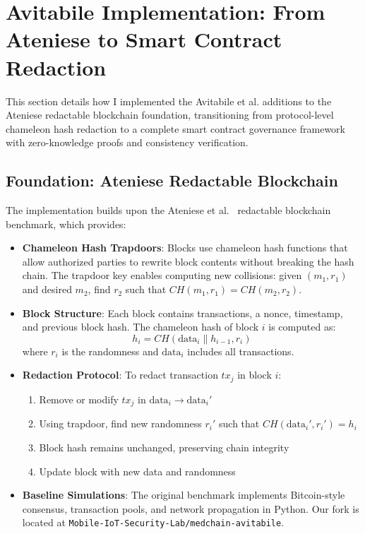 \section{Avitabile Implementation: From Ateniese to Smart Contract Redaction}
\label{sec:avitabile_implementation}

This section details how I implemented the Avitabile et al. additions to the Ateniese redactable blockchain foundation, transitioning from protocol-level chameleon hash redaction to a complete smart contract governance framework with zero-knowledge proofs and consistency verification.

\subsection{Foundation: Ateniese Redactable Blockchain}

The implementation builds upon the Ateniese et al.~\cite{ateniese2017redactable} redactable blockchain benchmark, which provides:

\begin{itemize}
    \item \textbf{Chameleon Hash Trapdoors}: Blocks use chameleon hash functions that allow authorized parties to rewrite block contents without breaking the hash chain. The trapdoor key enables computing new collisions: given $(m_1, r_1)$ and desired $m_2$, find $r_2$ such that $CH(m_1, r_1) = CH(m_2, r_2)$.
    
    \item \textbf{Block Structure}: Each block contains transactions, a nonce, timestamp, and previous block hash. The chameleon hash of block $i$ is computed as:
    \begin{equation}
        h_i = CH(\text{data}_i \| h_{i-1}, r_i)
    \end{equation}
    where $r_i$ is the randomness and $\text{data}_i$ includes all transactions.
    
    \item \textbf{Redaction Protocol}: To redact transaction $tx_j$ in block $i$:
    \begin{enumerate}
        \item Remove or modify $tx_j$ in $\text{data}_i \to \text{data}_i'$
        \item Using trapdoor, find new randomness $r_i'$ such that $CH(\text{data}_i', r_i') = h_i$
        \item Block hash remains unchanged, preserving chain integrity
        \item Update block with new data and randomness
    \end{enumerate}
    
    \item \textbf{Baseline Simulations}: The original benchmark implements Bitcoin-style consensus, transaction pools, and network propagation in Python. Our fork is located at \texttt{Mobile-IoT-Security-Lab/medchain-avitabile}.
\end{itemize}

